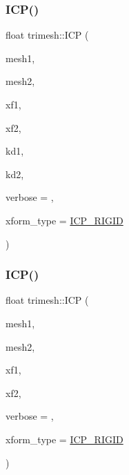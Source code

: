 \subsubsection{\texorpdfstring{I\+C\+P()}{ICP()}\hspace{0.1cm}{\footnotesize\ttfamily [2/7]}}
{\footnotesize\ttfamily float trimesh\+::\+I\+CP (\begin{DoxyParamCaption}\item[{\hyperlink{classtrimesh_1_1TriMesh}{Tri\+Mesh} $\ast$}]{mesh1,  }\item[{\hyperlink{classtrimesh_1_1TriMesh}{Tri\+Mesh} $\ast$}]{mesh2,  }\item[{const \hyperlink{namespacetrimesh_ad504958f2f56e393991b848986a8459f}{xform} \&}]{xf1,  }\item[{\hyperlink{namespacetrimesh_ad504958f2f56e393991b848986a8459f}{xform} \&}]{xf2,  }\item[{const \hyperlink{classtrimesh_1_1KDtree}{K\+Dtree} $\ast$}]{kd1,  }\item[{const \hyperlink{classtrimesh_1_1KDtree}{K\+Dtree} $\ast$}]{kd2,  }\item[{int}]{verbose = {},  }\item[{\hyperlink{namespacetrimesh_a64c747e4228158428e9cd911672cb1be}{I\+C\+P\+\_\+xform\+\_\+type}}]{xform\+\_\+type = {\ttfamily \hyperlink{namespacetrimesh_a64c747e4228158428e9cd911672cb1beab1d341808d3d7fb0bcff97fad1e83174}{I\+C\+P\+\_\+\+R\+I\+G\+ID}} }\end{DoxyParamCaption})}

\mbox{\label{namespacetrimesh_a0eee6ad23539d352b6afcefc4b521793}} 
\subsubsection{\texorpdfstring{I\+C\+P()}{ICP()}\hspace{0.1cm}{\footnotesize\ttfamily [3/7]}}
{\footnotesize\ttfamily float trimesh\+::\+I\+CP (\begin{DoxyParamCaption}\item[{\hyperlink{classtrimesh_1_1TriMesh}{Tri\+Mesh} $\ast$}]{mesh1,  }\item[{\hyperlink{classtrimesh_1_1TriMesh}{Tri\+Mesh} $\ast$}]{mesh2,  }\item[{const \hyperlink{namespacetrimesh_ad504958f2f56e393991b848986a8459f}{xform} \&}]{xf1,  }\item[{\hyperlink{namespacetrimesh_ad504958f2f56e393991b848986a8459f}{xform} \&}]{xf2,  }\item[{int}]{verbose = {},  }\item[{\hyperlink{namespacetrimesh_a64c747e4228158428e9cd911672cb1be}{I\+C\+P\+\_\+xform\+\_\+type}}]{xform\+\_\+type = {\ttfamily \hyperlink{namespacetrimesh_a64c747e4228158428e9cd911672cb1beab1d341808d3d7fb0bcff97fad1e83174}{I\+C\+P\+\_\+\+R\+I\+G\+ID}} }\end{DoxyParamCaption})}

